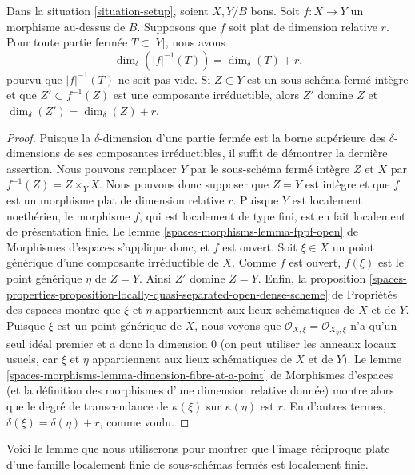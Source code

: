 \begin{lemma}
\label{lemma-flat-inverse-image-dimension}
Dans la situation \ref{situation-setup}, soient $X, Y/B$ bons. Soit $f :
X \to Y$ un morphisme au-dessus de $B$. Supposons que $f$ soit plat de
dimension relative $r$. Pour toute partie fermée $T \subset |Y|$, nous avons
$$
\dim_\delta(|f|^{-1}(T)) = \dim_\delta(T) + r.
$$
pourvu que $|f|^{-1}(T)$ ne soit pas vide. Si $Z \subset Y$ est un
sous-schéma fermé intègre et que $Z' \subset f^{-1}(Z)$ est une composante
irréductible, alors $Z'$ domine $Z$ et $\dim_\delta(Z') = \dim_\delta(Z) + r$.
\end{lemma}

\begin{proof}
Puisque la $\delta$-dimension d'une partie fermée est la borne supérieure des
$\delta$-dimensions de ses composantes irréductibles, il suffit de démontrer
la dernière assertion. Nous pouvons remplacer $Y$ par le sous-schéma fermé intègre
$Z$ et $X$ par $f^{-1}(Z) = Z \times_Y X$. Nous pouvons donc supposer que $Z =
Y$ est intègre et que $f$ est un morphisme plat de dimension relative $r$.
Puisque $Y$ est localement noethérien, le morphisme $f$, qui est localement de
type fini, est en fait localement de présentation finie. Le lemme
\ref{spaces-morphisms-lemma-fppf-open} de Morphismes d'espaces s'applique donc,
et $f$ est ouvert. Soit $\xi \in X$ un point générique d'une composante
irréductible de $X$. Comme $f$ est ouvert, $f(\xi)$ est le point
générique $\eta$ de $Z = Y$. Ainsi $Z'$ domine $Z = Y$. Enfin, la proposition
\ref{spaces-properties-proposition-locally-quasi-separated-open-dense-scheme}
de Propriétés des espaces montre que $\xi$ et $\eta$ appartiennent aux lieux
schématiques de $X$ et de $Y$.
Puisque $\xi$ est un point générique de $X$, nous voyons que $\mathcal{O}_{X,
\xi} = \mathcal{O}_{X_\eta, \xi}$ n'a qu'un seul idéal premier et a donc la
dimension $0$ (on peut utiliser les anneaux locaux usuels, car $\xi$ et
$\eta$ appartiennent aux lieux schématiques de $X$ et de $Y$). Le lemme
\ref{spaces-morphisms-lemma-dimension-fibre-at-a-point} de Morphismes d'espaces
(et la définition des morphismes d'une dimension relative donnée) montre alors que
le degré de transcendance de $\kappa(\xi)$ sur $\kappa(\eta)$ est $r$. En
d'autres termes, $\delta(\xi) = \delta(\eta) + r$, comme voulu.
\end{proof}

\noindent
Voici le lemme que nous utiliserons pour montrer que l'image réciproque plate
d'une famille localement finie de sous-schémas fermés est localement finie.

